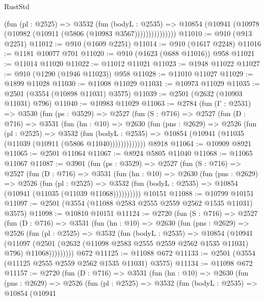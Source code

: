 \begin{lexlean}{RustStd}
\begin{coremodule}
                  (fun (pl : @2525) =>
                  @3532
                    (fun (bodyL : @2535) =>
                    @10854 (@10941 (@10978 (@10982 (@10911 (@5806 (@10983 @3567)))))))))))))))
@11010 := @910 (@913 @2251)
@11012 := @910 (@1609 @2251)
@11014 := @910 (@1617 @2248)
@11016 := @1181 @10077 @701
@11020 := @910 (@1623 (@688 @11016)) @958
@11021 := @11014 @11020
@11022 := @11012 @11021
@11023 := @1948 @11022
@11027 := @910 (@1290 (@1946 @11023)) @958
@11028 := @11010 @11027
@11029 := @1899 @11028
@11030 := @11008 @11029
@11031 := @10973 @11029
@11035 := @2501 (@3554 (@10898 @11031) @3575)
@11039 := @2501 (@2632 (@10903 @11031) @796)
@11040 := @10983 @11029
@11063 := @2784
    (fun (Γ : @2531) =>
    @3530
      (fun (ps : @3529) =>
      @2527
        (fun (S : @716) =>
        @2527
          (fun (D : @716) =>
          @3531
            (fun (hn : @10) =>
            @2630
              (fun (pns : @2629) =>
              @2526
                (fun (pl : @2525) =>
                @3532
                  (fun (bodyL : @2535) =>
                  @10854 (@10941 (@11035 (@11039 (@10911 (@5806 @11040)))))))))))))
    @8918
@11064 := @10909 @8921
@11065 := @2501 @11064
@11067 := @8924 @5805 @11040
@11068 := @11065 @11067
@11087 := @3901
    (fun (ps : @3529) =>
    @2527
      (fun (S : @716) =>
      @2527
        (fun (D : @716) =>
        @3531
          (fun (hn : @10) =>
          @2630
            (fun (pns : @2629) =>
            @2526
              (fun (pl : @2525) =>
              @3532 (fun (bodyL : @2535) => @10854 (@10941 (@11035 (@11039 @11068))))))))))
    @10151
@11088 := @10799 @10151
@11097 := @2501 (@3554 (@11088 @2583 @2555 @2559 @2562 @1535 @11031) @3575)
@11098 := @10810 @10151
@11124 := @2720
    (fun (S : @716) =>
    @2527
      (fun (D : @716) =>
      @3531
        (fun (hn : @10) =>
        @2630
          (fun (pns : @2629) =>
          @2526
            (fun (pl : @2525) =>
            @3532
              (fun (bodyL : @2535) =>
              @10854
                (@10941
                  (@11097
                    (@2501
                      (@2632 (@11098 @2583 @2555 @2559 @2562 @1535 @11031) @796)
                      @11068)))))))))
    @672
@11125 := @11088 @672
@11133 := @2501 (@3554 (@11125 @2555 @2559 @2562 @1535 @11031) @3575)
@11134 := @11098 @672
@11157 := @2720
    (fun (D : @716) =>
    @3531
      (fun (hn : @10) =>
      @2630
        (fun (pns : @2629) =>
        @2526
          (fun (pl : @2525) =>
          @3532
            (fun (bodyL : @2535) =>
            @10854
              (@10941

\end{coremodule}
\end{lexlean}
